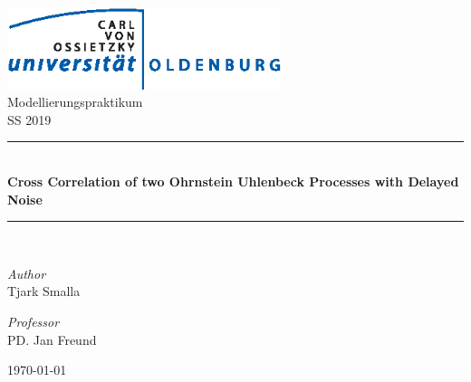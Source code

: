 \documentclass[a4paper,12pt,oneside]{book}
\theoremstyle{break}
\begin{document}

\begin{titlepage}
\begin{center}

\includegraphics[width=0.6\textwidth]{uol}\\[1cm]

{\large Modellierungspraktikum}\\[0.5cm]

{\large SS 2019}\\[0.5cm]

\rule{\linewidth}{0.5mm} \\[0.4cm]
{ \huge \bfseries Cross Correlation of two Ohrnstein Uhlenbeck Processes with Delayed Noise \\[0.4cm] }
\rule{\linewidth}{0.5mm} \\[1.5cm]

\noindent
\begin{minipage}{0.4\textwidth}
  \begin{flushleft} \large
    \emph{Author}\\
    Tjark Smalla\\
  \end{flushleft}
\end{minipage}%
\begin{minipage}{0.4\textwidth}
  \begin{flushright} \large
    \emph{Professor} \\
    PD. Jan Freund
  \end{flushright}
\end{minipage}

\vfill

{\large \today}

\end{center}
\end{titlepage}


\frontmatter

\tableofcontents

\clearpage
\listoffigures
\end{document}
